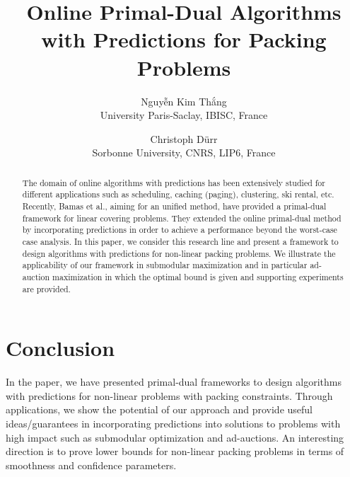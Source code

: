 \documentclass[11pt,a4paper]{article}
\title{Online Primal-Dual Algorithms with Predictions for Packing Problems}
\author{
Nguyễn Kim Thắng \\
University Paris-Saclay, IBISC, France
\and Christoph D\"urr \\
Sorbonne University, CNRS, LIP6, France
}
\begin{document}
\maketitle

\begin{abstract}
The domain of online algorithms with predictions has been extensively studied
for different applications such as scheduling, caching (paging), clustering, ski rental, etc.
Recently, Bamas et al., aiming for an unified method, have provided a primal-dual framework 
for linear covering problems. They extended the online primal-dual method by incorporating 
predictions in order to achieve a performance beyond the worst-case case analysis.
In this paper, we consider this research line and  present a framework to design algorithms with predictions for non-linear 
packing problems. We illustrate the applicability of our framework in submodular maximization
and in particular ad-auction maximization in which the optimal bound is given and supporting experiments are provided.
\end{abstract}








%



%



\section{Conclusion}

In the paper, we have presented primal-dual 
frameworks to design algorithms with predictions for non-linear problems with packing constraints.
Through applications, we show the potential of our approach and provide useful ideas/guarantees 
in incorporating predictions into solutions to problems with high impact such as submodular optimization and ad-auctions. 
An interesting direction is to prove lower bounds for non-linear packing problems
in terms of smoothness and confidence parameters.


 
\end{document}
